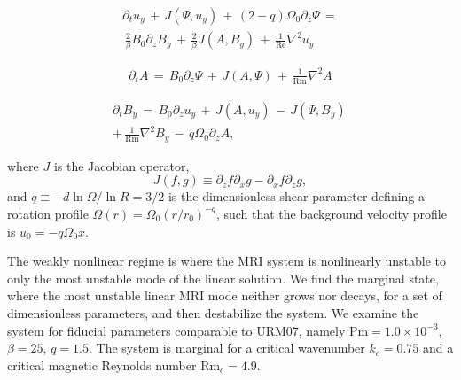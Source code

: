 \documentclass{emulateapj}
\newcommand{\beq}{\begin{equation}}
\newcommand{\eeq}{\end{equation}}
\newcommand\reye{\mathrm{Re}}
\newcommand\reym{\mathrm{Rm}}
\newcommand{\Pm}{\mathrm{Pm}}
\begin{document}
\begin{multline}
\label{eqset2}
\partial_t u_{y} \, + \, J\left(\Psi, u_{y}\right) \, + \, \left(2 - q\right) \Omega_0 \partial_z \Psi \, = \\
\, \frac{2}{\beta}B_0\partial_z B_{y} \, + \, \frac{2}{\beta} J\left(A, B_{y}\right) \, + \, \frac{1}{\reye} \nabla^2 u_{y}
\end{multline}

\begin{multline}
\label{eqset3}
\partial_t A \, = \, B_0 \partial_z \Psi \, + \, J\left(A, \Psi\right) \, + \, \frac{1}{\reym} \nabla^2 A
\end{multline}

\begin{multline}
\label{eqset4}
\partial_t B_{y} \, = \, B_0 \partial_z u_{y} \, + \, J\left(A, u_{y}\right) \, - \, J\left(\Psi, B_{y}\right) \, \\
+ \, \frac{1}{\reym} \nabla^2 B_{y}  \, - \, q \Omega_0 \partial_z A,
\end{multline}

where $J$ is the Jacobian operator, 
\beq
J\left(f, g\right) \equiv \partial_z f\partial_x g - \partial_x f \partial_z g,
\eeq  
and $q \equiv - d \ln \Omega/ \ln R = 3/2$ is the dimensionless shear parameter defining a rotation profile $\Omega(r) = \Omega_0 (r/r_0)^{-q}$, such that the background velocity profile is $u_0 = -q \Omega_0 x$.

The weakly nonlinear regime is where the MRI system is nonlinearly unstable to only the most unstable mode of the linear solution. We find the marginal state, where the most unstable linear MRI mode neither grows nor decays, for a set of dimensionless parameters, and then destabilize the system. We examine the system for fiducial parameters comparable to URM07, namely $\Pm = 1.0 \times 10^{-3}$, $\beta = 25$, $q = 1.5$. The system is marginal for a critical wavenumber $k_c = 0.75$ and a critical magnetic Reynolds number $\reym_c = 4.9$.
\end{document}
